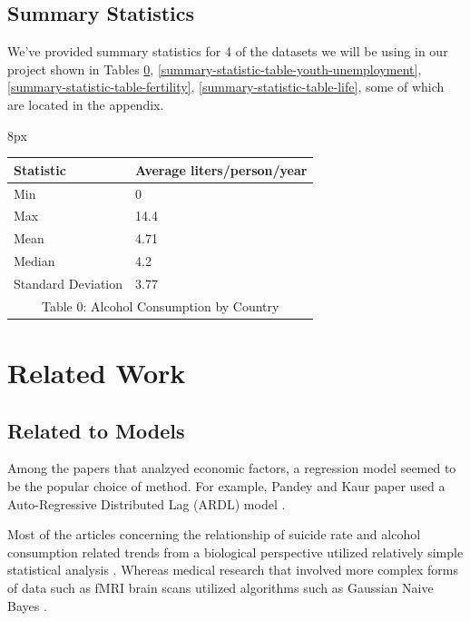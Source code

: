 \documentclass{article}
\begin{document}
\begin{multicols}{2}
\subsection{Summary Statistics} 
We've provided summary statistics for 4 of the datasets we will be using in our project shown in Tables \hyperref[summary-statistic-table-alcohol]{0}, \ref{summary-statistic-table-youth-unemployment}, \ref{summary-statistic-table-fertility}, \ref{summary-statistic-table-life}, some of which are located in the appendix.

\begin{adjustwidth}{8px}{}
\begin{tabular}{|l|l|}
\hline
Statistic          & Average liters/person/year \\ \hline
Min                & 0                          \\ \hline
Max                & 14.4                       \\ \hline
Mean               & 4.71                       \\ \hline
Median             & 4.2                        \\ \hline
Standard Deviation & 3.77                       \\ \hline
\multicolumn{2}{c}{Table 0: Alcohol Consumption by Country} 
\label{summary-statistic-table-alcohol}
\end{tabular}
\end{adjustwidth}


\section{Related Work}
\subsection{Related to Models} 

Among the papers that analzyed economic factors, a regression model seemed to be the popular choice of method. For example, Pandey and Kaur paper used a Auto-Regressive Distributed Lag (ARDL) model . 

Most of the articles concerning the relationship of suicide rate and alcohol consumption related trends from a biological perspective utilized relatively simple statistical analysis . Whereas medical research that involved more complex forms of data such as fMRI brain scans utilized algorithms such as Gaussian Naive Bayes .


\end{multicols}
\end{document}
